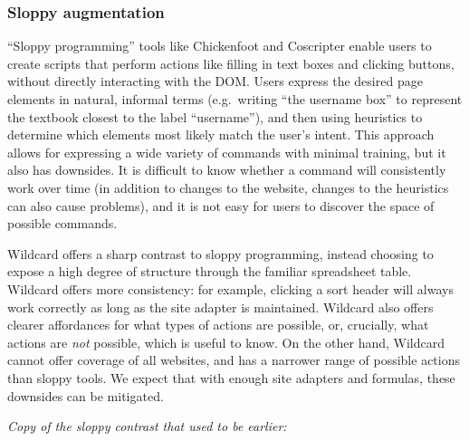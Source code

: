 \documentclass[english,submission]{programming}
\begin{document}
\hypertarget{sloppy-augmentation}{%
\subsubsection{Sloppy augmentation}\label{sloppy-augmentation}}

``Sloppy programming'' \autocite{little2010} tools like Chickenfoot
\autocite{bolin2005} and Coscripter \autocite{leshed2008} enable users
to create scripts that perform actions like filling in text boxes and
clicking buttons, without directly interacting with the DOM. Users
express the desired page elements in natural, informal terms
(e.g.~writing ``the username box'' to represent the textbook closest to
the label ``username''), and then using heuristics to determine which
elements most likely match the user's intent. This approach allows for
expressing a wide variety of commands with minimal training, but it also
has downsides. It is difficult to know whether a command will
consistently work over time (in addition to changes to the website,
changes to the heuristics can also cause problems), and it is not easy
for users to discover the space of possible commands.

Wildcard offers a sharp contrast to sloppy programming, instead choosing
to expose a high degree of structure through the familiar spreadsheet
table. Wildcard offers more consistency: for example, clicking a sort
header will always work correctly as long as the site adapter is
maintained. Wildcard also offers clearer affordances for what types of
actions are possible, or, crucially, what actions are \emph{not}
possible, which is useful to know. On the other hand, Wildcard cannot
offer coverage of all websites, and has a narrower range of possible
actions than sloppy tools. We expect that with enough site adapters and
formulas, these downsides can be mitigated.

\emph{Copy of the sloppy contrast that used to be earlier:}
\end{document}
